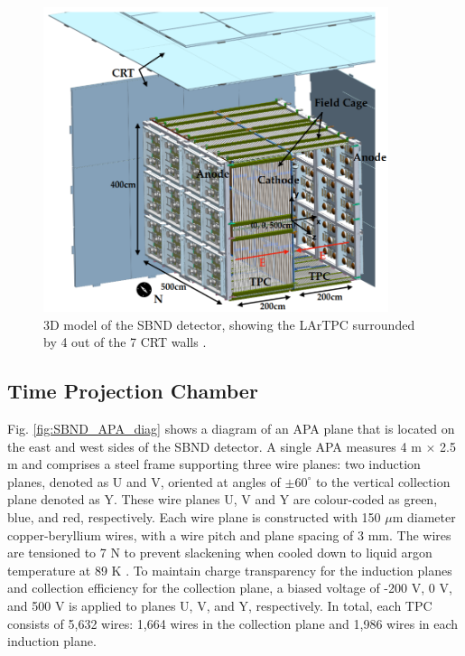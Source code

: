 \begin{figure}[htbp] 
\centering    
\includegraphics[width=0.9\textwidth]{SBND_Pretty}
\caption[Short-Baseline Near Detector 3D Model]{
3D model of the SBND detector, showing the LArTPC surrounded by 4 out of the 7 CRT walls \cite{sbnd_pds_paper}. 
}
\label{fig:SBND_Pretty}
\end{figure}

\subsection{Time Projection Chamber}

Fig. \ref{fig:SBND_APA_diag} shows a diagram of an APA plane that is located on the east and west sides of the SBND detector.
A single APA measures 4 m $\times$ 2.5 m and comprises a steel frame supporting three wire planes: two induction planes, denoted as U and V, oriented at angles of $\pm 60^{\circ}$ to the vertical collection plane denoted as Y. 
These wire planes U, V and Y are colour-coded as green, blue, and red, respectively.
Each wire plane is constructed with 150 $\mu$m diameter copper-beryllium wires, with a wire pitch and plane spacing of 3 mm. 
The wires are tensioned to 7 N to prevent slackening when cooled down to liquid argon temperature at 89 K \cite{SBND_Wires}.
To maintain charge transparency for the induction planes and collection efficiency for the collection plane, a biased voltage of -200 V, 0 V, and 500 V is applied to planes U, V, and Y, respectively.
In total, each TPC consists of 5,632 wires: 1,664 wires in the collection plane and 1,986 wires in each induction plane.

